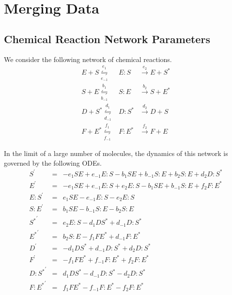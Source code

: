\chapter{Merging Data\label{app:merging}}

\graphicspath{{ch-merging/figures/}}

\section{Chemical Reaction Network Parameters} \label{app:rxn}

We consider the following network of chemical reactions.
\begin{equation}
\begin{array}{rcl}
E + S \overset{e_1}{\underset{e_{-1}}{\leftrightharpoons}} & E:S & \overset{e_2}{\rightarrow} E + S^{*} \\
S + E \overset{b_1}{\underset{b_{-1}}{\leftrightharpoons}} & S:E & \overset{b_2}{\rightarrow} S + E^{*}\\
D + S^{*} \overset{d_1}{\underset{d_{-1}}{\leftrightharpoons}} & D:S^{*} & \overset{d_2}{\rightarrow} D + S\\
F + E^{*} \overset{f_1}{\underset{f_{-1}}{\leftrightharpoons}} & F:E^{*} & \overset{f_2}{\rightarrow} F + E
\end{array}
\end{equation}

In the limit of a large number of molecules, the dynamics of this network is governed by the following ODEs.
\begin{equation}
    \begin{array}{rcl}
        S^\prime & = & -e_1 S E + e_{-1} E:S -b_1 S E + b_{-1} S:E + b_2 S:E + d_2 D:S^{*} \\
        E^\prime & = & -e_1 S E + e_{-1} E:S + e_2 E:S - b_1 S E +b_{-1} S:E + f_2 F:E^{*} \\
        E:S^\prime & = & e_1 S E -e_{-1} E:S -e_2 E:S \\
        S:E^\prime & = & b_1 S E -b_{-1} S:E -b_2 S:E \\
        {S^{*}}^\prime & = & e_2 E:S -d_1 D S^{*} + d_{-1} D:S^{*} \\
        {E^{*}}^\prime & = & b_2 S:E -f_1 F E^{*} + d_{-1} F:E^{*} \\
        D^\prime & = & -d_1 D S^{*} + d_{-1} D:S^{*} + d_2 D:S^{*} \\
        F^\prime & = & -f_1 F E^{*} + f_{-1} F:E^{*} + f_2 F:E^{*} \\
        {D:S^{*}}^\prime & = & d_1 D S^{*} - d_{-1} D:S^{*} -d_2 D:S^{*} \\
        {F:E^{*}}^\prime & = & f_1 FE^{*} - f_{-1} F:E^{*} -f_2 F:E^{*}
    \end{array}
\end{equation}

